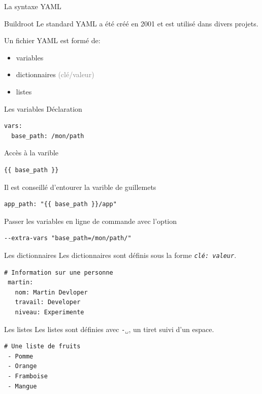 \documentclass[compress]{smilebeamer}
\begin{document}
\begin{frame}
\begin{center}
\textcolor{smileOrange}{\huge{La syntaxe YAML}}
\end{center}
\end{frame}

\begin{frame}
\begin{exampleblock}{Buildroot}
Le standard YAML a été créé en 2001 et est utilisé dans divers projets.
\end{exampleblock}
Un fichier YAML est formé de:
\begin{itemize}
	\item variables
	\item dictionnaires \textcolor{gray}{(clé/valeur)}
	\item listes
\end{itemize}
\end{frame}

\begin{frame}[fragile]{Les variables}
Déclaration
\begin{lstlisting}[style=shell]
vars:
  base_path: /mon/path
\end{lstlisting}
Accès à la varible
\begin{lstlisting}[style=shell]
{{ base_path }}
\end{lstlisting}
Il est conseillé d'entourer la varible de guillemets
\begin{lstlisting}[style=shell]
app_path: "{{ base_path }}/app"
\end{lstlisting}
Passer les variables en ligne de commande avec l'option
\begin{lstlisting}[style=shell]
--extra-vars "base_path=/mon/path/"
\end{lstlisting}
\end{frame}

\begin{frame}[fragile]{Les dictionnaires}
Les dictionnaires sont définis sous la forme \textit{\texttt{clé: valeur}}.
\begin{lstlisting}[style=bitbake]
# Information sur une personne
 martin:
   nom: Martin Devloper
   travail: Developer
   niveau: Experimente
\end{lstlisting}
\end{frame}

\begin{frame}[fragile]{Les listes}
Les listes sont définies avec \textit{\texttt{-\textcolor{gray}{␣}}}, un tiret suivi d’un espace.
\begin{lstlisting}[style=bitbake]
# Une liste de fruits
 - Pomme
 - Orange
 - Framboise
 - Mangue
\end{lstlisting}
\end{frame}
\end{document}
